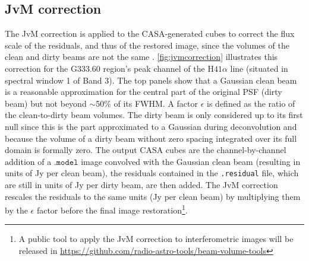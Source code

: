 \documentclass[longauth]{aa} %
\begin{document}
\subsection{JvM correction}
\label{sec:jvm}
The JvM correction \citep{Jorsater1995} is applied to the CASA-generated cubes to correct the flux scale of the residuals, and thus of the restored image, since the volumes of the clean and dirty beams are not the same \citep[see also][]{walter2008,Czekala2021}. \cref{fig:jvmcorrection} illustrates this correction for the G333.60 region's peak channel of the H$41\alpha$ line (situated in spectral window 1 of Band 3). The top panels show that a Gaussian clean beam is a reasonable approximation for the central part of the original PSF (dirty beam) but not beyond $\sim$50\% of its FWHM. A factor $\epsilon$ is defined as the ratio of the clean-to-dirty beam volumes. 
The dirty beam is only considered up to its first null since this is the part approximated to a Gaussian during deconvolution and because the volume of a dirty beam without zero spacing integrated over its full domain is formally zero.
The output CASA cubes are the channel-by-channel addition of a $\texttt{.model}$ image convolved with the Gaussian clean beam (resulting in units of Jy per clean beam), the residuals contained in the \texttt{.residual} file, which are still in units of Jy per dirty beam, are then added. The JvM correction rescales the residuals to the same units (Jy per clean beam) by multiplying them by the $\epsilon$ factor before the final image restoration\footnote{A public tool to apply the JvM correction to interferometric images will be released in \url{https://github.com/radio-astro-tools/beam-volume-tools}}.
\end{document}
